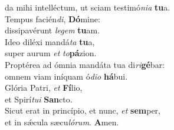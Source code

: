 \oddverse da mihi intelléctum, ut sciam testimó\textit{ni}\textit{a} \textbf{tu}a.\\
\evenverse Tempus facién\textit{di}, \textbf{Dó}mine:~\*\\
\evenverse dissipavérunt \textit{le}\textit{gem} \textbf{tu}am.\\
\oddverse Ideo diléxi mandá\textit{ta} \textbf{tu}a,~\*\\
\oddverse super aurum \textit{et} \textit{to}\textbf{pá}zion.\\
\evenverse Proptérea ad ómnia mandáta tua di\textit{ri}\textbf{gé}bar:~\*\\
\evenverse omnem viam iníquam ó\textit{di}\textit{o} \textbf{há}bui.\\
\oddverse Glória Patri, \textit{et} \textbf{Fí}lio,~\*\\
\oddverse et Spirí\textit{tu}\textit{i} \textbf{San}cto.\\
\evenverse Sicut erat in princípio, et nunc, \textit{et} \textbf{sem}per,~\*\\
\evenverse et in sǽcula sæcu\textit{ló}\textit{rum}. \textbf{A}men.\\
